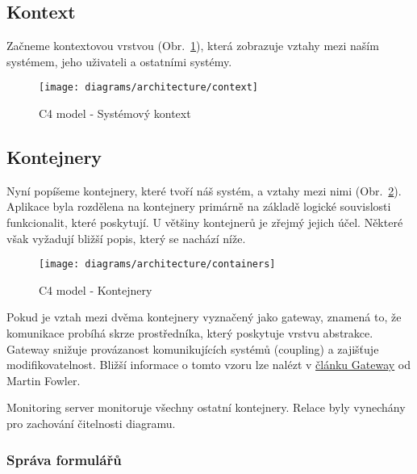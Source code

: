 \subsection{Kontext}\label{subsec:kontext}

Začneme kontextovou vrstvou (Obr.~\ref{fig:architecture-context}), která zobrazuje vztahy mezi naším systémem, jeho uživateli a ostatními systémy.

\begin{figure}[H]
    \centering
    \texttt{[image: diagrams/architecture/context]}
    \caption{C4 model - Systémový kontext}\label{fig:architecture-context}
\end{figure}

\subsection{Kontejnery}\label{subsec:kontejnery}

Nyní popíšeme kontejnery, které tvoří náš systém, a vztahy mezi nimi (Obr.~\ref{fig:architecture-containers}).
Aplikace byla rozdělena na kontejnery primárně na základě logické souvislosti funkcionalit, které poskytují.
U většiny kontejnerů je zřejmý jejich účel.
Některé však vyžadují bližší popis, který se nachází níže.

\begin{figure}[H]
    \centering
    \texttt{[image: diagrams/architecture/containers]}
    \caption{C4 model - Kontejnery}\label{fig:architecture-containers}
\end{figure}

\begin{tcolorbox}
    Pokud je vztah mezi dvěma kontejnery vyznačený jako gateway, znamená to, že komunikace probíhá skrze prostředníka, který poskytuje vrstvu abstrakce.
    Gateway snižuje provázanost komunikujících systémů (coupling) a zajišťuje modifikovatelnost.
    Bližší informace o tomto vzoru lze nalézt v \href{https://martinfowler.com/articles/gateway-pattern.html}{článku Gateway} od Martin Fowler.
\end{tcolorbox}

\begin{tcolorbox}
    Monitoring server monitoruje všechny ostatní kontejnery.
    Relace byly vynechány pro zachování čitelnosti diagramu.
\end{tcolorbox}

\subsubsection{Správa formulářů}\label{subsubsec:sprava-formularu}

